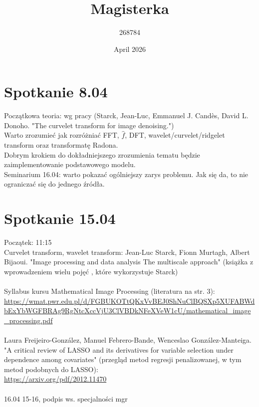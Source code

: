 \documentclass{article}
\title{Magisterka}
\author{268784 }
\date{April 2026}
\begin{document}

\section{Spotkanie 8.04}
Pocz\k{a}tkowa teoria: wg pracy (Starck, Jean-Luc, Emmanuel J. Cand\`es, David L. Donoho. "The curvelet transform for image denoising.")\\
Warto zrozumie\'c jak rozr\'o\.znia\'c FFT, $\hat{f}$, DFT, wavelet/curvelet/ridgelet transform oraz transformatę Radona.\\
Dobrym krokiem do dok\l{}adniejszego zrozumienia tematu b\k{e}dzie zaimplementowanie podstawowego modelu.\\
Seminarium 16.04: warto pokaza\'c og\'olniejszy zarys problemu. Jak si\k{e} da, to nie ogranicza\'c si\k{e} do jednego \'zr\'od\l{}a.
\section{Spotkanie 15.04}
Pocz\k{a}tek: 11:15\\
Curvelet transform, wavelet transform: Jean-Luc Starck, Fionn Murtagh, Albert Bijaoui. "Image processing and data analysis The multiscale approach" (książka z wprowadzeniem wielu pojęć , które wykorzystuje Starck)\\\\
Syllabus kursu Mathematical Image Processing (literatura na str. 3):\\ \url{https://wmat.pwr.edu.pl/d/FGBUKOTtQKxVvBEJ0ShNuClBQSXp5XUFABWdbExYbWGFBRAg9RgNtcXccVjU3ClVBDkNFeXVeW1cU/mathematical_image_processing.pdf}\\\\
Laura Freijeiro-Gonz\'alez, Manuel Febrero-Bande, Wenceslao
Gonz\'alez-Manteiga. "A critical review of LASSO and its derivatives for variable
selection under dependence among covariates" (przegląd metod regresji penalizowanej, w tym metod podobnych do LASSO):\\
\url{https://arxiv.org/pdf/2012.11470}\\\\
16.04 15-16, podpis ws. specjalności mgr
\end{document}
